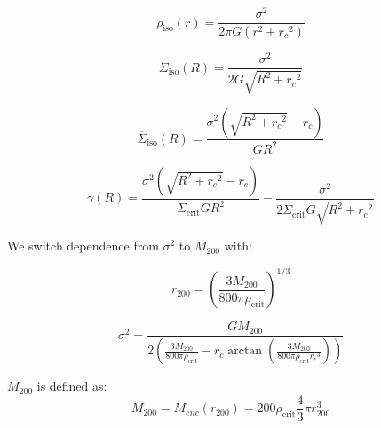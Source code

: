 \documentclass[]{article}
\begin{document}
\begin{equation}
    \rho_\mathrm{iso}(r) = \frac{\sigma^2}{2\pi G (r^2 + {r_c}^2)}
\end{equation}

\begin{equation}
    \Sigma_\mathrm{iso}(R) = \frac{\sigma^2}{2 G \sqrt{R^2 + {r_c}^2}}
\end{equation}

\begin{equation}
    \overline{\Sigma}_\mathrm{iso}(R) = \frac{\sigma^2 \left(\sqrt{R^2 + {r_c}^2} - r_c \right)}{G R^2}
\end{equation}

\begin{equation}
    \gamma(R) = \frac{\sigma^2 \left(\sqrt{R^2 + {r_c}^2} - r_c \right)}{\Sigma_\mathrm{crit} G R^2} - \frac{\sigma^2}{2 \Sigma_\mathrm{crit} G \sqrt{R^2 + {r_c}^2}}
\end{equation}

We switch dependence from $\sigma^2$ to $M_{200}$ with:

\begin{equation}
    r_{200} = \left( \frac{3 M_{200}}{800 \pi \rho_\mathrm{crit}} \right)^{1/3}
\end{equation}

\begin{equation}
    \sigma^2 = \frac{G M_{200}}{2 \left(
        \frac{3 M_{200}}{800 \pi \rho_\mathrm{crit}}
        - r_c \arctan \left(
            \frac{3 M_{200}}{800 \pi \rho_\mathrm{crit} {r_c}^3}
        \right)
    \right)}
\end{equation}


$M_{200}$ is defined as:
\begin{equation}
    M_{200} = M_{enc}(r_{200}) = 200 \rho_\mathrm{crit} \frac{4}{3} \pi r_{200}^3
\end{equation}
\end{document}
